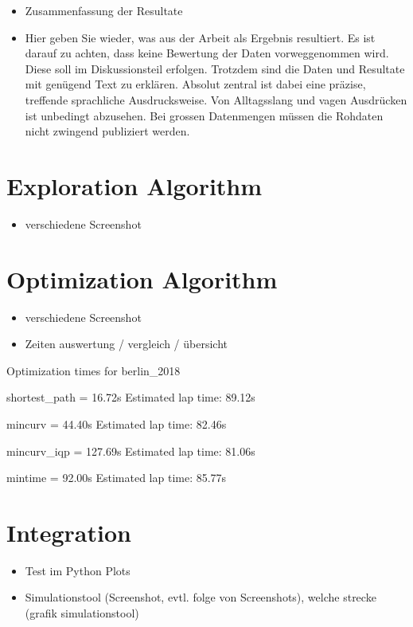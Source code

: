 \begin{itemize}
    \item Zusammenfassung der Resultate
    \item Hier geben Sie wieder, was aus der Arbeit als Ergebnis resultiert. Es ist darauf zu achten, dass keine Bewertung der Daten vorweggenommen wird. Diese soll im Diskussionsteil erfolgen. Trotzdem sind die Daten und Resultate mit genügend Text zu erklären. Absolut zentral ist dabei eine präzise, treffende sprachliche Ausdrucksweise. Von Alltagsslang und vagen Ausdrücken ist unbedingt abzusehen.
          Bei grossen Datenmengen müssen die Rohdaten nicht zwingend publiziert werden.
\end{itemize}

\section{Exploration Algorithm}
\begin{itemize}
    \item verschiedene Screenshot
\end{itemize}

\section{Optimization Algorithm}
\begin{itemize}
    \item verschiedene Screenshot
    \item Zeiten auswertung / vergleich / übersicht
\end{itemize}
Optimization times for berlin\_2018

shortest\_path = 16.72s
Estimated lap time: 89.12s

mincurv = 44.40s
Estimated lap time: 82.46s

mincurv\_iqp = 127.69s
Estimated lap time: 81.06s

mintime = 92.00s
Estimated lap time: 85.77s

\section{Integration}
\begin{itemize}
    \item Test im Python Plots
    \item Simulationstool (Screenshot, evtl. folge von Screenshots), welche strecke (grafik simulationstool)
\end{itemize}

